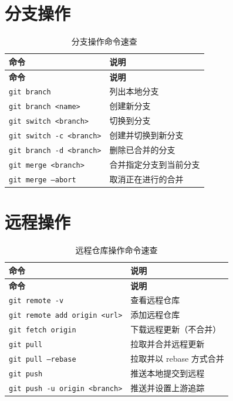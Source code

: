 \documentclass[12pt,a4paper,openany]{ctexbook}
\begin{document}
\section{分支操作}

\begin{longtable}{p{5.5cm} p{9cm}}
\caption{分支操作命令速查}\label{tab:cmd-branch}\\
\toprule
\textbf{命令} & \textbf{说明} \\
\midrule
\endfirsthead
\toprule
\textbf{命令} & \textbf{说明} \\
\midrule
\endhead
\texttt{git branch} & 列出本地分支 \\
\texttt{git branch <name>} & 创建新分支 \\
\texttt{git switch <branch>} & 切换到分支 \\
\texttt{git switch -c <branch>} & 创建并切换到新分支 \\
\texttt{git branch -d <branch>} & 删除已合并的分支 \\
\texttt{git merge <branch>} & 合并指定分支到当前分支 \\
\texttt{git merge --abort} & 取消正在进行的合并 \\
\bottomrule
\end{longtable}

\section{远程操作}

\begin{longtable}{p{5.5cm} p{9cm}}
\caption{远程仓库操作命令速查}\label{tab:cmd-remote}\\
\toprule
\textbf{命令} & \textbf{说明} \\
\midrule
\endfirsthead
\toprule
\textbf{命令} & \textbf{说明} \\
\midrule
\endhead
\texttt{git remote -v} & 查看远程仓库 \\
\texttt{git remote add origin <url>} & 添加远程仓库 \\
\texttt{git fetch origin} & 下载远程更新（不合并） \\
\texttt{git pull} & 拉取并合并远程更新 \\
\texttt{git pull --rebase} & 拉取并以 rebase 方式合并 \\
\texttt{git push} & 推送本地提交到远程 \\
\texttt{git push -u origin <branch>} & 推送并设置上游追踪 \\
\bottomrule
\end{longtable}
\end{document}
